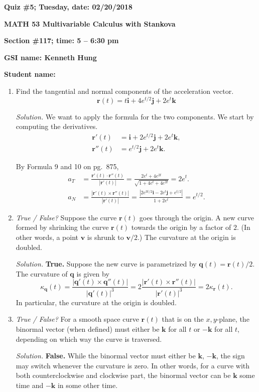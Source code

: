 \documentclass{article}
\newcommand{\qq}{\mathbf{q}}
\newcommand{\rr}{\mathbf{r}}
\newcommand{\ii}{\mathbf{i}}
\newcommand{\jj}{\mathbf{j}}
\newcommand{\kk}{\mathbf{k}}
\begin{document}
{\bf Quiz \#5; Tuesday, date: 02/20/2018}

{\bf MATH 53 Multivariable Calculus with Stankova}

{\bf Section \#117; time: 5 -- 6:30 pm}

{\bf GSI name: Kenneth Hung}

{\bf Student name:}

\vspace*{0.25in}

\begin{enumerate}
\item Find the tangential and normal components of the acceleration vector.
\[
\rr(t) = t \ii + 4e^{t/2} \jj + 2e^t \kk
\]

{\em Solution.} We want to apply the formula for the two components. We start by computing the derivatives.
\begin{align*}
\rr'(t) & = \ii + 2e^{t/2} \jj + 2e^t \kk, \\
\rr''(t) & = e^{t/2} \jj + 2e^t \kk.
\end{align*}

By Formula 9 and 10 on pg.\ 875,
\begin{align*}
a_T & = \frac{\rr'(t) \cdot \rr''(t)}{|\rr'(t)|} = \frac{2e^t + 4e^{2t}}{\sqrt{1 + 4e^t + 4e^{2t}}} = 2e^t. \\
a_N & = \frac{|\rr'(t) \times \rr''(t)|}{|\rr'(t)|} = \frac{|2e^{3t/2} \ii - 2e^t \jj + e^{t/2}|}{1 + 2e^t} = e^{t/2}.
\end{align*}

\item {\em True / False?} Suppose the curve $\rr(t)$ goes through the origin. A new curve formed by shrinking the curve $\rr(t)$ towards the origin by a factor of $2$. (In other words, a point $\mathbf{v}$ is shrunk to $\mathbf{v} / 2$.) The curvature at the origin is doubled.

{\em Solution.} {\bf True.} Suppose the new curve is parametrized by $\qq(t) = \rr(t) / 2$. The curvature of $\qq$ is given by
\[
\kappa_{\qq}(t) = \frac{|\qq'(t) \times \qq''(t)|}{|\qq'(t)|^3} = 2 \frac{|\rr'(t) \times \rr''(t)|}{|\rr'(t)|^3} = 2 \kappa_{\rr}(t).
\]
In particular, the curvature at the origin is doubled.

\item {\em True / False?} For a smooth space curve $\rr(t)$ that is on the $x, y$-plane, the binormal vector (when defined) must either be $\kk$ for all $t$ or $-\kk$ for all $t$, depending on which way the curve is traversed.

{\em Solution.} {\bf False.} While the binormal vector must either be $\kk$, $-\kk$, the sign may switch whenever the curvature is zero. In other words, for a curve with both counterclockwise and clockwise part, the binormal vector can be $\kk$ some time and $-\kk$ in some other time.
\end{enumerate}
\end{document}
